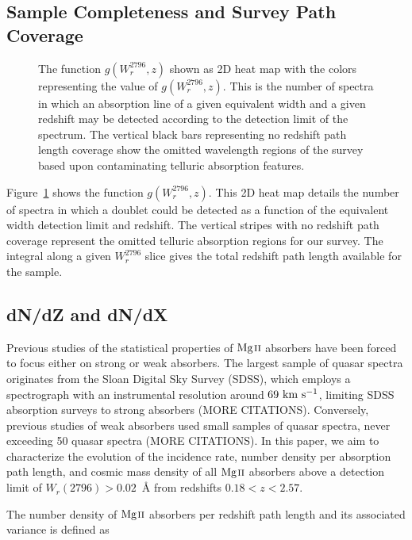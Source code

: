 \documentclass[iop,apj,numberedappendix,appendixfloats,twocolappendix]{emulateapj}
\begin{document}
\subsection{Sample Completeness and Survey Path Coverage}

\begin{figure}[bth]
\caption{The function $g(W_r^{2796}, z)$ shown as 2D heat map with the colors representing the value of $g(W_r^{2796}, z)$. This is the number of spectra in which an absorption line of a given equivalent width and a given redshift may be detected according to the detection limit of the spectrum. The vertical black bars representing no redshift path length coverage show the omitted wavelength regions of the survey based upon contaminating telluric absorption features.}
\label{fig:gwz}
\end{figure}

Figure~\ref{fig:gwz} shows the function $g(W_r^{2796}, z)$. This 2D heat map details the number of spectra in which a {\MgIIdblt} doublet could be detected as a function of the equivalent width detection limit and redshift. The vertical stripes with no redshift path coverage represent the omitted telluric absorption regions for our survey. The integral along a given $W_r^{2796}$ slice gives the total redshift path length available for the sample. 

\subsection{dN/dZ and dN/dX}
\label{dndzdndx}

Previous studies of the statistical properties of ${\hbox{{\rm Mg}\kern 0.1em{\sc ii}}}$ absorbers have been forced to focus either on strong or weak absorbers. The largest sample of quasar spectra originates from the Sloan Digital Sky Survey (SDSS), which employs a spectrograph with an instrumental resolution around $69~\hbox{km~s$^{-1}$}$, limiting SDSS absorption surveys to strong absorbers \citep{Zhu2013,Cooksey2013} (MORE CITATIONS). Conversely, previous studies of weak absorbers used small samples of quasar spectra, never exceeding 50 quasar spectra \citep{Kacprzak2011} (MORE CITATIONS). In this paper, we aim to characterize the evolution of the incidence rate, number density per absorption path length, and cosmic mass density of all ${\hbox{{\rm Mg}\kern 0.1em{\sc ii}}}$ absorbers above a detection limit of $W_r(2796) > 0.02$~{\AA} from redshifts $0.18 < z < 2.57$.

The number density of ${\hbox{{\rm Mg}\kern 0.1em{\sc ii}}}$ absorbers per redshift path length and its associated variance is defined as
\end{document}
